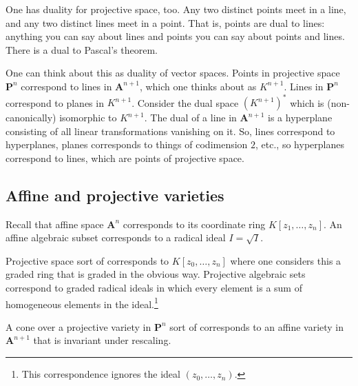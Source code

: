 \documentclass [11 pt, oneside] {article}
\begin{document}
One has duality for projective space, too. Any two distinct points meet in a line, and any two distinct lines meet in a point. That is, points are dual to lines: anything you can say about lines and points you can say about points and lines. There is a dual to Pascal's theorem. 

One can think about this as duality of vector spaces. Points in projective space $\mathbf{P}^n$ correspond to lines in $\mathbf{A}^{n+1}$, which one thinks about as $K^{n+1}$. Lines in $\mathbf{P}^n$ correspond to planes in $K^{n+1}$. Consider the dual space $(K^{n+1})^*$ which is (non-canonically) isomorphic to $K^{n+1}$. The dual of a line in $\mathbf{A}^{n+1}$ is a hyperplane consisting of all linear transformations vanishing on it. So, lines correspond to hyperplanes, planes corresponds to things of codimension $2$, etc., so hyperplanes correspond to lines, which are points of projective space.

\subsection{Affine and projective varieties}
Recall that affine space $\mathbf{A}^n$ corresponds to its coordinate ring $K[z_1,\hdots, z_n]$. An affine algebraic subset corresponds to a radical ideal $I=\sqrt{I} $.

Projective space sort of corresponds to $K[z_0,\hdots, z_n]$ where one considers this a graded ring that is graded in the obvious way. Projective algebraic sets correspond to graded radical ideals in which every element is a sum of homogeneous elements in the ideal.\footnote{This correspondence ignores the ideal $(z_0,\hdots, z_n)$.} 

A cone over a projective variety in $\mathbf{P}^n$ sort of corresponds to an affine variety in $\mathbf{A}^{n+1}$ that is invariant under rescaling.
\end{document}
